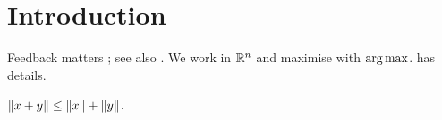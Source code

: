 \section{Introduction}\label{sec:intro}
Feedback matters \autocite{hattie2007}; see also \textcite{becker2019, knuth84}.
We work in $\mathbb{R}^n$ and maximise with $\operatorname{arg\,max}$.  has details.
\begin{lemma}\label{lem:first}
$\lVert x + y \rVert \leq \lVert x \rVert + \lVert y \rVert$.
\end{lemma}
